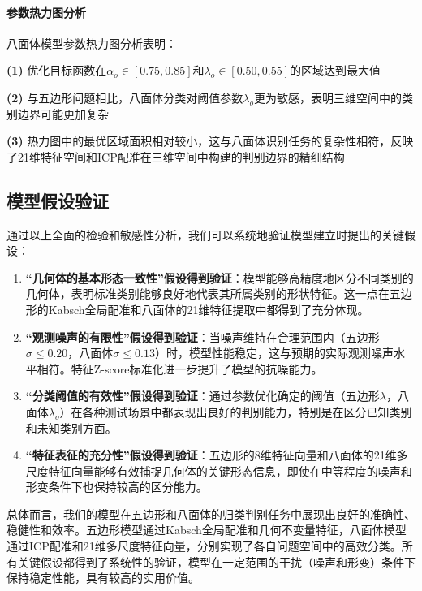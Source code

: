 \paragraph{参数热力图分析}

八面体模型参数热力图分析表明：

\textbf{(1)} 优化目标函数在$\alpha_o \in [0.75, 0.85]$和$\lambda_o \in [0.50, 0.55]$的区域达到最大值

\textbf{(2)} 与五边形问题相比，八面体分类对阈值参数$\lambda_o$更为敏感，表明三维空间中的类别边界可能更加复杂

\textbf{(3)} 热力图中的最优区域面积相对较小，这与八面体识别任务的复杂性相符，反映了21维特征空间和ICP配准在三维空间中构建的判别边界的精细结构



\subsection{模型假设验证}

通过以上全面的检验和敏感性分析，我们可以系统地验证模型建立时提出的关键假设：

\begin{enumerate}
    \item \textbf{“几何体的基本形态一致性”假设得到验证}：模型能够高精度地区分不同类别的几何体，表明标准类别能够良好地代表其所属类别的形状特征。这一点在五边形的Kabsch全局配准和八面体的21维特征提取中都得到了充分体现。
    
    \item \textbf{“观测噪声的有限性”假设得到验证}：当噪声维持在合理范围内（五边形$\sigma \leq 0.20$，八面体$\sigma \leq 0.13$）时，模型性能稳定，这与预期的实际观测噪声水平相符。特征Z-score标准化进一步提升了模型的抗噪能力。
    
    \item \textbf{“分类阈值的有效性”假设得到验证}：通过参数优化确定的阈值（五边形$\lambda$，八面体$\lambda_o$）在各种测试场景中都表现出良好的判别能力，特别是在区分已知类别和未知类别方面。
    
    \item \textbf{“特征表征的充分性”假设得到验证}：五边形的8维特征向量和八面体的21维多尺度特征向量能够有效捕捉几何体的关键形态信息，即使在中等程度的噪声和形变条件下也保持较高的区分能力。
\end{enumerate}

总体而言，我们的模型在五边形和八面体的归类判别任务中展现出良好的准确性、稳健性和效率。五边形模型通过Kabsch全局配准和几何不变量特征，八面体模型通过ICP配准和21维多尺度特征向量，分别实现了各自问题空间中的高效分类。所有关键假设都得到了系统性的验证，模型在一定范围的干扰（噪声和形变）条件下保持稳定性能，具有较高的实用价值。

